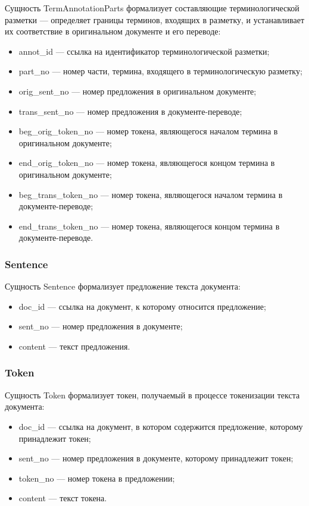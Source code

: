 Сущность TermAnnotationParts формализует составляющие терминологической разметки --- определяет границы терминов, входящих в разметку, и устанавливает их соответствие в оригинальном документе и его переводе:
\begin{itemize}
    \item annot\_id --- ссылка на идентификатор терминологической разметки;
    \item part\_no --- номер части, термина, входящего в терминологическую разметку;
    \item orig\_sent\_no --- номер предложения в оригинальном документе;
    \item trans\_sent\_no --- номер предложения в документе-переводе;
    \item beg\_orig\_token\_no --- номер токена, являющегося началом термина в оригинальном документе;
    \item end\_orig\_token\_no --- номер токена, являющегося концом термина в оригинальном документе;
    \item beg\_trans\_token\_no --- номер токена, являющегося началом термина в документе-переводе;
    \item end\_trans\_token\_no --- номер токена, являющегося концом термина в документе-переводе.
\end{itemize}

\subsubsection*{Sentence}

Сущность Sentence формализует предложение текста документа:
\begin{itemize}
    \item doc\_id --- ссылка на документ, к которому относится предложение;
    \item sent\_no --- номер предложения в документе;
    \item content --- текст предложения.
\end{itemize}

\subsubsection*{Token}

Сущность Token формализует токен, получаемый в процессе токенизации текста документа:
\begin{itemize}
    \item doc\_id --- ссылка на документ, в котором содержится предложение, которому принадлежит токен;
    \item sent\_no --- номер предложения в документе, которому принадлежит токен;
    \item token\_no --- номер токена в предложении;
    \item content --- текст токена.
\end{itemize}

